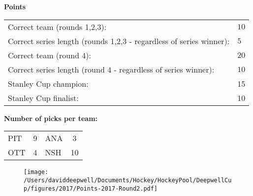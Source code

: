 \documentclass[10pt]{article}
\begin{document}
{\bf Points}\\
\begin{minipage}{12cm}
    \begin{tabular}{l l}
        Correct team (rounds 1,2,3):	& $10$\\
        Correct series length (rounds 1,2,3 - regardless of series winner):	& $5$\\
        Correct team (round 4):	& $20$\\
        Correct series length (round 4 - regardless of series winner):	& $10$\\
        Stanley Cup champion:	& 15\\
        Stanley Cup finalist:	& 10\\
    \end{tabular}

    \vspace{1cm}
    {\bf Number of picks per team:}\\
    \begin{tabular}{lc | lc }
        PIT & 9 & ANA & 3 \\
        OTT & 4 & NSH & 10 \\
    \end{tabular}
\end{minipage}
\begin{minipage}[t]{13cm}
    \begin{figure}[H]
        \vspace{-2.5cm}
        \texttt{[image: /Users/daviddeepwell/Documents/Hockey/HockeyPool/DeepwellCup/figures/2017/Points-2017-Round2.pdf]}
    \end{figure}
\end{minipage}
\end{document}
